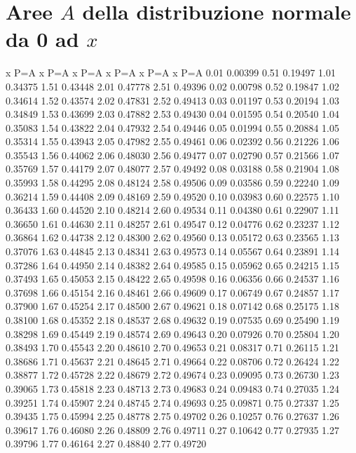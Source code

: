 \documentclass[onecolumn,12pt]{book}
\begin{document}
\section*{Aree $A$  della distribuzione normale da 0 ad $x$}
\oddsidemargin  0.0in
\evensidemargin 0.0in
\topmargin -0.4in
\small
\begin{Schunk}
\begin{Soutput}
    x     P=A    x     P=A    x     P=A    x     P=A    x     P=A    x     P=A
 0.01 0.00399 0.51 0.19497 1.01 0.34375 1.51 0.43448 2.01 0.47778 2.51 0.49396
 0.02 0.00798 0.52 0.19847 1.02 0.34614 1.52 0.43574 2.02 0.47831 2.52 0.49413
 0.03 0.01197 0.53 0.20194 1.03 0.34849 1.53 0.43699 2.03 0.47882 2.53 0.49430
 0.04 0.01595 0.54 0.20540 1.04 0.35083 1.54 0.43822 2.04 0.47932 2.54 0.49446
 0.05 0.01994 0.55 0.20884 1.05 0.35314 1.55 0.43943 2.05 0.47982 2.55 0.49461
 0.06 0.02392 0.56 0.21226 1.06 0.35543 1.56 0.44062 2.06 0.48030 2.56 0.49477
 0.07 0.02790 0.57 0.21566 1.07 0.35769 1.57 0.44179 2.07 0.48077 2.57 0.49492
 0.08 0.03188 0.58 0.21904 1.08 0.35993 1.58 0.44295 2.08 0.48124 2.58 0.49506
 0.09 0.03586 0.59 0.22240 1.09 0.36214 1.59 0.44408 2.09 0.48169 2.59 0.49520
 0.10 0.03983 0.60 0.22575 1.10 0.36433 1.60 0.44520 2.10 0.48214 2.60 0.49534
 0.11 0.04380 0.61 0.22907 1.11 0.36650 1.61 0.44630 2.11 0.48257 2.61 0.49547
 0.12 0.04776 0.62 0.23237 1.12 0.36864 1.62 0.44738 2.12 0.48300 2.62 0.49560
 0.13 0.05172 0.63 0.23565 1.13 0.37076 1.63 0.44845 2.13 0.48341 2.63 0.49573
 0.14 0.05567 0.64 0.23891 1.14 0.37286 1.64 0.44950 2.14 0.48382 2.64 0.49585
 0.15 0.05962 0.65 0.24215 1.15 0.37493 1.65 0.45053 2.15 0.48422 2.65 0.49598
 0.16 0.06356 0.66 0.24537 1.16 0.37698 1.66 0.45154 2.16 0.48461 2.66 0.49609
 0.17 0.06749 0.67 0.24857 1.17 0.37900 1.67 0.45254 2.17 0.48500 2.67 0.49621
 0.18 0.07142 0.68 0.25175 1.18 0.38100 1.68 0.45352 2.18 0.48537 2.68 0.49632
 0.19 0.07535 0.69 0.25490 1.19 0.38298 1.69 0.45449 2.19 0.48574 2.69 0.49643
 0.20 0.07926 0.70 0.25804 1.20 0.38493 1.70 0.45543 2.20 0.48610 2.70 0.49653
 0.21 0.08317 0.71 0.26115 1.21 0.38686 1.71 0.45637 2.21 0.48645 2.71 0.49664
 0.22 0.08706 0.72 0.26424 1.22 0.38877 1.72 0.45728 2.22 0.48679 2.72 0.49674
 0.23 0.09095 0.73 0.26730 1.23 0.39065 1.73 0.45818 2.23 0.48713 2.73 0.49683
 0.24 0.09483 0.74 0.27035 1.24 0.39251 1.74 0.45907 2.24 0.48745 2.74 0.49693
 0.25 0.09871 0.75 0.27337 1.25 0.39435 1.75 0.45994 2.25 0.48778 2.75 0.49702
 0.26 0.10257 0.76 0.27637 1.26 0.39617 1.76 0.46080 2.26 0.48809 2.76 0.49711
 0.27 0.10642 0.77 0.27935 1.27 0.39796 1.77 0.46164 2.27 0.48840 2.77 0.49720

\end{Soutput}
\end{Schunk}
\end{document}

